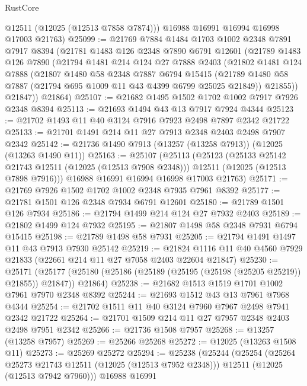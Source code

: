 \begin{lexlean}{RustCore}
\begin{coremodule}
        @12511
        (@12025 (@12513 @7858 @7874)))
      @16988
      @16991
      @16994
      @16998
      @17003
      @21763)
@25099 := @21769
    @7884
    @1484
    @1703
    @1002
    @2348
    @7891
    @7917
    @8394
    (@21781
      @1483
      @126
      @2348
      @7890
      @6791
      @12601
      (@21789
        @1483
        @126
        @7890
        (@21794
          @1481
          @214
          @124
          @27
          @7888
          @2403
          (@21802
            @1481
            @124
            @7888
            (@21807
              @1480
              @58
              @2348
              @7887
              @6794
              @15415
              (@21789 @1480 @58 @7887 (@21794 @695 @1009 @11 @43 @4399 @6799 @25025 @21849))
              @21855))
          @21847))
      @21864)
@25107 := @21682 @1495 @1502 @1702 @1002 @7917 @7926 @2348 @8394
@25113 := @21693 @1494 @43 @13 @7917 @7924 @4344
@25123 := @21702 @1493 @11 @40 @3124 @7916 @7923 @2498 @7897 @2342 @21722
@25133 := @21701 @1491 @214 @11 @27 @7913 @2348 @2403 @2498 @7907 @2342
@25142 := @21736 @1490 @7913 (@13257 (@13258 @7913)) (@12025 (@13263 @1490 @11))
@25163 := @25107
    (@25113
      (@25123
        (@25133 @25142 @21743 @12511 (@12025 (@12513 @7908 @2348)))
        @12511
        (@12025 (@12513 @7898 @7916)))
      @16988
      @16991
      @16994
      @16998
      @17003
      @21763)
@25171 := @21769 @7926 @1502 @1702 @1002 @2348 @7935 @7961 @8392
@25177 := @21781 @1501 @126 @2348 @7934 @6791 @12601
@25180 := @21789 @1501 @126 @7934
@25186 := @21794 @1499 @214 @124 @27 @7932 @2403
@25189 := @21802 @1499 @124 @7932
@25195 := @21807 @1498 @58 @2348 @7931 @6794 @15415
@25198 := @21789 @1498 @58 @7931
@25205 := @21794 @1491 @1497 @11 @43 @7913 @7930 @25142
@25219 := @21824 @1116 @11 @40 @4560 @7929 @21833 (@22661 @214 @11 @27 @7058 @2403 @22604 @21847)
@25230 := @25171
    (@25177 (@25180 (@25186 (@25189 (@25195 (@25198 (@25205 @25219)) @21855)) @21847)) @21864)
@25238 := @21682 @1513 @1519 @1701 @1002 @7961 @7970 @2348 @8392
@25244 := @21693 @1512 @43 @13 @7961 @7968 @4344
@25254 := @21702 @1511 @11 @40 @3124 @7960 @7967 @2498 @7941 @2342 @21722
@25264 := @21701 @1509 @214 @11 @27 @7957 @2348 @2403 @2498 @7951 @2342
@25266 := @21736 @1508 @7957
@25268 := @13257 (@13258 @7957)
@25269 := @25266 @25268
@25272 := @12025 (@13263 @1508 @11)
@25273 := @25269 @25272
@25294 := @25238
    (@25244
      (@25254
        (@25264 @25273 @21743 @12511 (@12025 (@12513 @7952 @2348)))
        @12511
        (@12025 (@12513 @7942 @7960)))
      @16988
      @16991

\end{coremodule}
\end{lexlean}
